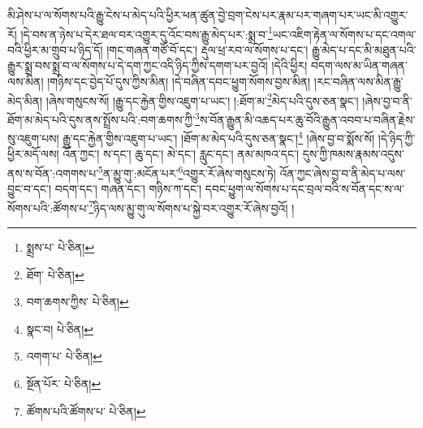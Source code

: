 མི་ཤེས་པ་ལ་སོགས་པའི་རྒྱུ་ངེས་པ་མེད་པའི་ཕྱིར་ཕན་ཚུན་བྱེ་བྲག་ངེས་པར་རྣམ་པར་གཞག་པར་ཡང་མི་འགྱུར་རོ། །དེ་བས་ན་ཉེས་པ་དེར་ཐལ་བར་འགྱུར་དུ་འོང་བས་རྒྱུ་མེད་པར་:སྨྲ་བ་\footnote{སྨྲས་པ་  པེ་ཅིན། }ཡང་འཇིག་རྟེན་ལ་སོགས་པ་དང་འགལ་བའི་ཕྱིར་མ་གྲུབ་པ་ཉིད་དོ། །གང་གཞན་གཙོ་བོ་དང་། རྡུལ་ཕྲ་རབ་ལ་སོགས་པ་དང་། རྒྱུ་མེད་པ་དང་མི་མཐུན་པའི་རྒྱུར་སྨྲ་བས་སྨྲ་བ་ལ་སོགས་པ་དེ་དག་ཀྱང་འདི་ཉིད་ཀྱིས་དགག་པར་བྱའོ། །དེའི་ཕྱིར། བདག་ལས་མ་ཡིན་གཞན་ལས་མིན། །གཉིས་དང་བྱེད་པོ་དུས་ཀྱིས་མིན། །དེ་བཞིན་དབང་ཕྱུག་སོགས་བྱས་མིན། །རང་བཞིན་ལས་མིན་རྒྱུ་མེད་མིན། །ཞེས་གསུངས་སོ། །རྒྱུ་དང་རྐྱེན་གྱིས་འཇུག་པ་ཡང་། །:ཐོག་མ་\footnote{ཐོག་  པེ་ཅིན། }མེད་པའི་དུས་ཅན་སྣང་། །ཞེས་བྱ་བ་ནི་ཐོག་མ་མེད་པའི་དུས་ནས་སྤྲོས་པའི་:བག་ཆགས་ཀྱི་\footnote{བག་ཆགས་ཀྱིས་  པེ་ཅིན། }ས་བོན་རྒྱུན་མི་འཆད་པར་ཆུ་བོའི་རྒྱུན་འབབ་པ་བཞིན་རྗེས་སུ་འཇུག་པས། རྒྱུ་དང་རྐྱེན་གྱིས་འཇུག་པ་ཡང་། །ཐོག་མ་མེད་པའི་དུས་ཅན་སྣང་།\footnote{སྣང་བ།  པེ་ཅིན། } །ཞེས་བྱ་བ་སྨོས་སོ། །དེ་ཉིད་ཀྱི་ཕྱིར་མདོ་ལས། འོན་ཀྱང་། ས་དང་། ཆུ་དང་། མེ་དང་། རླུང་དང་། ནམ་མཁའ་དང་། དུས་ཀྱི་ཁམས་རྣམས་འདུས་ནས་ས་བོན་:འགགས་པ་\footnote{འགག་པ་  པེ་ཅིན། }ན་མྱུ་གུ་:མངོན་པར་\footnote{སྔོན་པོར་  པེ་ཅིན། }འགྱུར་རོ་ཞེས་གསུངས་ཏེ། འོན་ཀྱང་ཞེས་བྱ་བ་ནི་མེད་པ་ལས་བྱུང་བ་དང་། བདག་དང་། གཞན་དང་། གཉིས་ཀ་དང་། དབང་ཕྱུག་ལ་སོགས་པ་དང་བྲལ་བའི་ས་བོན་དང་ས་ལ་སོགས་པའི་:ཚོགས་པ་\footnote{ཚོགས་པའི་ཚོགས་པ་  པེ་ཅིན། }ཉིད་ལས་མྱུ་གུ་ལ་སོགས་པ་སྐྱེ་བར་འགྱུར་རོ་ཞེས་བྱའོ། །
